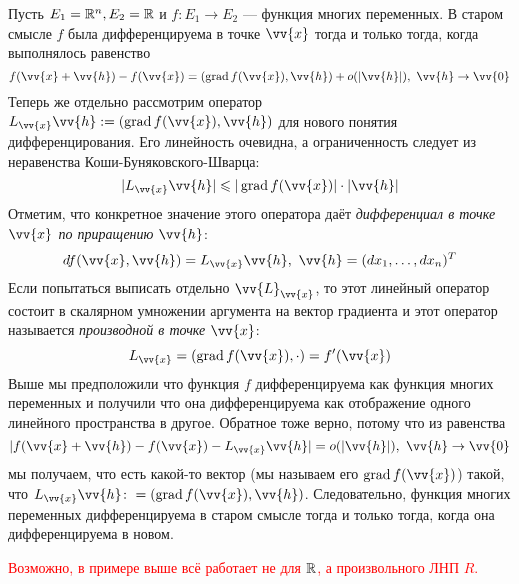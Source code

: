\begin{example}
    Пусть $E_1 = \mathbb{R}^n, E_2 = \mathbb{R}$ и $f \colon E_1 \to E_2$ --- функция многих переменных. В старом смысле $f$ была дифференцируема в точке $\vv{x}$ тогда и только тогда, когда выполнялось равенство
    \[
    	f(\vv{x} + \vv{h}) - f(\vv{x}) = (\grad f(\vv{x}), \vv{h}) + o(|\vv{h}|),\ \vv{h} \to \vv{0}
    \]
    Теперь же отдельно рассмотрим оператор $L_{\vv{x}}\vv{h} := (\grad f(\vv{x}), \vv{h})$ для нового понятия дифференцирования. Его линейность очевидна, а ограниченность следует из неравенства Коши-Буняковского-Шварца:
    \[
    	|L_{\vv{x}}\vv{h}| \le |\grad f(\vv{x})| \cdot |\vv{h}|
    \]
    Отметим, что конкретное значение этого оператора даёт \textit{дифференциал в точке $\vv{x}$ по приращению $\vv{h}$}:
    \[
    	df(\vv{x}, \vv{h}) = L_{\vv{x}}\vv{h},\ \vv{h} = (dx_1, \ldots, dx_n)^T
    \]
    Если попытаться выписать отдельно $\vv{L}_{\vv{x}}$, то этот линейный оператор состоит в скалярном умножении аргумента на вектор градиента и этот оператор называется \textit{производной в точке $\vv{x}$}:
    \[
         L_{\vv{x}} = (\grad f(\vv{x}), \cdot) = f'(\vv{x})
    \]
    Выше мы предположили что функция $f$ дифференцируема как функция многих переменных и получили что она дифференцируема как отображение одного линейного пространства в другое. Обратное тоже верно, потому что из равенства
    \[
        |f(\vv{x} + \vv{h}) - f(\vv{x}) - L_{\vv{x}}\vv{h}|  = o(|\vv{h}|),\ \vv{h} \to \vv{0}
    \]
     мы получаем, что есть какой-то вектор (мы называем его $\grad f(\vv{x})$) такой, что $L_{\vv{x}} \vv{h} \colon = (\grad f(\vv{x}), \vv{h})$.
     Следовательно, функция многих переменных дифференцируема в старом смысле тогда и только тогда, когда она дифференцируема в новом.
\end{example}

\textcolor{red}{Возможно, в примере выше всё работает не для $\mathbb{R}$, а произвольного ЛНП $R$.}

